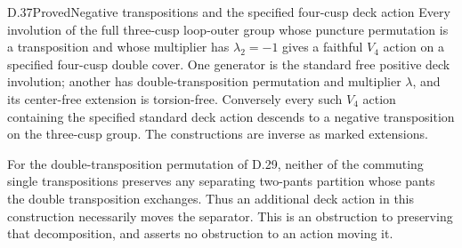 \begin{claim}{D.37}{Proved}{Negative transpositions and the specified four-cusp deck action}
Every involution of the full three-cusp loop-outer group whose
puncture permutation is a transposition and whose multiplier has
$\lambda_2=-1$ gives a faithful $V_4$ action on a specified
four-cusp double cover.  One generator is the standard free positive
deck involution; another has double-transposition permutation and
multiplier $\lambda$, and its center-free extension is torsion-free.
Conversely every such $V_4$ action containing the specified standard
deck action descends to a negative transposition on the three-cusp
group.  The constructions are inverse as marked extensions.

For the double-transposition permutation of D.29, neither of the
commuting single transpositions preserves any separating two-pants
partition whose pants the double transposition exchanges.  Thus an
additional deck action in this construction necessarily moves the
separator.  This is an obstruction to preserving that decomposition,
and asserts no obstruction to an action moving it.
\end{claim}
